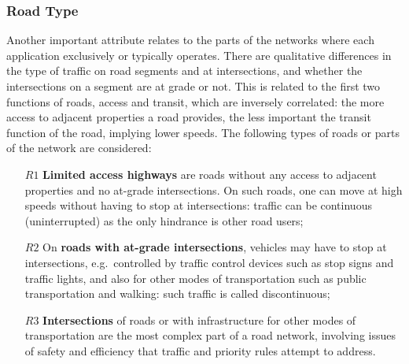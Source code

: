 \subsubsection{Road Type}
Another important attribute relates to the parts of the networks where each application exclusively or typically operates. There are qualitative differences in the type of traffic on road segments and at intersections, and whether the intersections on a segment are at grade or not. This is related to the first two functions of roads, access and transit, which are inversely correlated: the more access to adjacent properties a road provides, the less important the transit function of the road, implying lower speeds. 
The following types of roads or parts of the network are considered:



\begin{enumerate}
\item[$R1$] {\bf Limited access highways} are roads without any access to adjacent properties and no at-grade intersections. On such roads, one can move at high speeds without having to stop at intersections: traffic can be continuous (uninterrupted) as the only hindrance is other road users;%
\item[$R2$] On {\bf roads with at-grade intersections}, vehicles may have to stop at intersections, e.g.\ controlled by traffic control devices such as stop signs and traffic lights, and also for other modes of transportation such as public transportation and walking: such traffic is called discontinuous;
\item[$R3$] {\bf Intersections} of roads or with infrastructure for other modes of transportation are the most complex part of a road network, involving issues of safety and efficiency that traffic and priority rules attempt to address. %
\end{enumerate}


